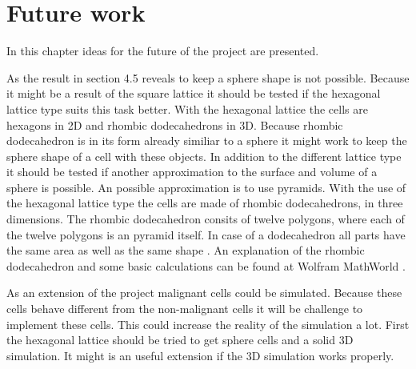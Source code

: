 \chapter{Future work}
In this chapter ideas for the future of the project are presented.

As the result in section 4.5 reveals to keep a sphere shape is not possible. Because it might be a result of the square lattice it should be tested if the hexagonal lattice type suits this task better. With the hexagonal lattice the cells are hexagons in 2D and rhombic dodecahedrons in 3D. Because rhombic dodecahedron is in its form already similiar to a sphere it might work to keep the sphere shape of a cell with these objects. \newline
In addition to the different lattice type it should be tested if another approximation to the surface and volume of a sphere is possible. An possible approximation is to use pyramids. With the use of the hexagonal lattice type the cells are made of rhombic dodecahedrons, in three dimensions. The rhombic dodecahedron consits of twelve polygons, where each of the twelve polygons is an pyramid itself. In case of a dodecahedron all parts have the same area as well as the same shape \cite{Horn1984}. An explanation of the rhombic dodecahedron and some basic calculations can be found at Wolfram MathWorld \cite{RhombicDodecahedron.html}.

As an extension of the project malignant cells could be simulated. Because these cells behave different from the non-malignant cells it will be challenge to implement these cells. This could increase the reality of the simulation a lot. First the hexagonal lattice should be tried to get sphere cells and a solid 3D simulation. It might is an useful extension if the 3D simulation works properly.

